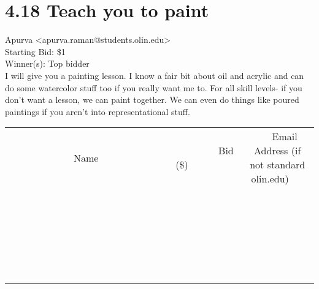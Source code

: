 \documentclass[11pt]{article}
\begin{document}
					\section*{4.18 Teach you to paint}
					Apurva <apurva.raman@students.olin.edu> \\
					Starting Bid: \$1 \\
					Winner(s): Top bidder \\
					I will give you a painting lesson. I know a fair bit about oil and acrylic and can do some watercolor stuff too if you really want me to. For all skill levels- if you don't want a lesson, we can paint together. We can even do things like poured paintings if you aren't into representational stuff. \\
					[6ex]
					\begin{tabular}{c c c}
						~~~~~~~~~~~~~Name~~~~~~~~~~~~~ & ~~~~~~~~~Bid (\$)~~~~~~~~~ & ~~~Email Address (if not standard olin.edu)~~~ \\
				
 & & \\
\hline
 & & \\
\hline
 & & \\
\hline
 & & \\
\hline
 & & \\
\hline
 & & \\
\hline
 & & \\
\hline
 & & \\
\hline
 & & \\
\hline
 & & \\
\hline
 & & \\
\hline
 & & \\
\hline
 & & \\
\hline
 & & \\
\hline
 & & \\
\hline
 & & \\
\hline
 & & \\
\hline
 & & \\
\hline
 & & \\
\hline
 & & \\
\hline
 & & \\
\hline
 & & \\
\hline
 & & \\
\hline
 & & \\
\hline
 & & \\
\hline
 & & \\
\hline
					\end{tabular}
					\clearpage
				
\end{document}
